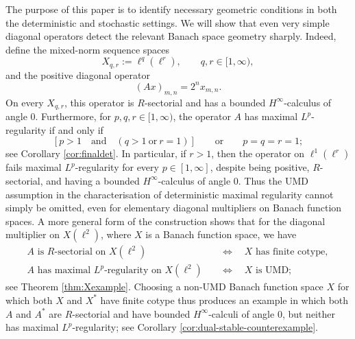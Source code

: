 \documentclass{amsart}
\theoremstyle{plain}
\theoremstyle{remark}
\theoremstyle{plain}
\numberwithin{equation}{section}
\newcommand{\1}{\mathbf 1}
\begin{document}
The purpose of this paper is to identify necessary geometric conditions in both the deterministic and stochastic settings. We will show that even very simple diagonal operators detect the relevant Banach space geometry sharply. Indeed, define  the mixed-norm sequence spaces
\[
        X_{q,r}:=\ell^q(\ell^r),\qquad q,r\in[1,\infty),
\]
and the positive diagonal operator
\begin{equation}\label{eq:defAintro}
     (Ax)_{m,n}=2^n x_{m,n}.
\end{equation}
On every $X_{q,r}$, this operator is $R$-sectorial and has a bounded $H^\infty$-calculus of angle $0$. Furthermore,  for $p,q,r\in[1,\infty)$, the operator $A$ has maximal $L^p$-regularity if and only if
\[
\left[
        p>1
        \quad\text{and}\quad
        (q>1\ \text{or}\ r=1)
\right]
\qquad\text{or}\qquad
        p=q=r=1;
\]
see Corollary \ref{cor:finaldet}. In particular, if $r>1$, then the operator on $\ell^1(\ell^r)$ fails maximal $L^p$-regularity for every $p\in[1,\infty]$, despite being positive, $R$-sectorial, and having a bounded $H^\infty$-calculus of angle $0$. Thus the UMD assumption in the characterisation of deterministic maximal regularity cannot simply be omitted, even for elementary diagonal multipliers on Banach function spaces.
A more general form of the construction shows that for the diagonal multiplier on $X(\ell^2)$, where $X$ is a Banach function space, we have 
\[
\begin{aligned}
 A\text{ is $R$-sectorial on }X(\ell^2)
     &\quad\Longleftrightarrow\quad
     X\text{ has finite cotype},\\
 A\text{ has maximal $L^p$-regularity on }X(\ell^2)
     &\quad\Longleftrightarrow\quad
     X\text{ is UMD};
\end{aligned}
\]
see Theorem \ref{thm:Xexample}. Choosing a non-UMD Banach function space $X$ for which both $X$ and $X^*$ have finite cotype thus produces an example in which both $A$ and $A^*$ are $R$-sectorial and have bounded $H^\infty$-calculi of angle $0$, but neither has maximal $L^p$-regularity; see Corollary \ref{cor:dual-stable-counterexample}.
\end{document}

